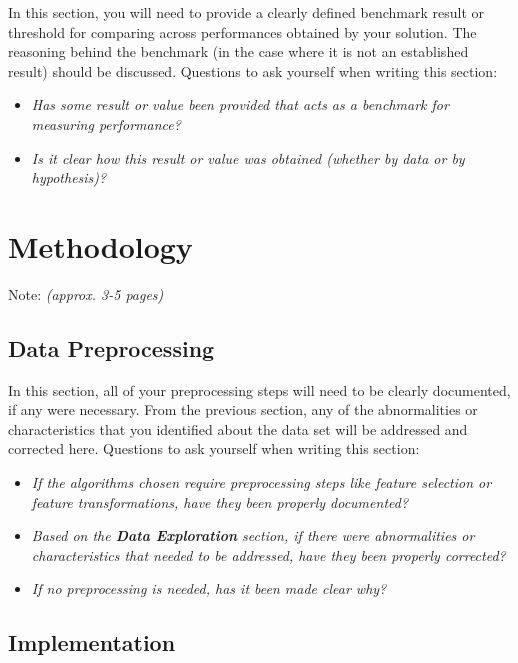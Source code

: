 \documentclass{article}
\begin{document}
In this section, you will need to provide a clearly defined benchmark
result or threshold for comparing across performances obtained by your
solution. The reasoning behind the benchmark (in the case where it is
not an established result) should be discussed. Questions to ask
yourself when writing this section:

\begin{itemize}
\item
  \emph{Has some result or value been provided that acts as a benchmark
  for measuring performance?}
\item
  \emph{Is it clear how this result or value was obtained (whether by
  data or by hypothesis)?}
\end{itemize}

\section{Methodology}\label{methodology}

Note: \emph{(approx. 3-5 pages)}

\subsection{Data Preprocessing}\label{data-preprocessing}

In this section, all of your preprocessing steps will need to be clearly
documented, if any were necessary. From the previous section, any of the
abnormalities or characteristics that you identified about the data set
will be addressed and corrected here. Questions to ask yourself when
writing this section:

\begin{itemize}
\item
  \emph{If the algorithms chosen require preprocessing steps like
  feature selection or feature transformations, have they been properly
  documented?}
\item
  \emph{Based on the \textbf{Data Exploration} section, if there were
  abnormalities or characteristics that needed to be addressed, have
  they been properly corrected?}
\item
  \emph{If no preprocessing is needed, has it been made clear why?}
\end{itemize}

\subsection{Implementation}\label{implementation}
\end{document}
